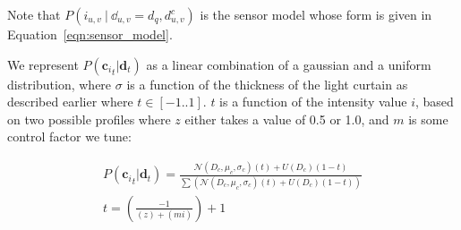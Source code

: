 Note that $P(i_{u, v}\ |\ \dd_{u, v} = d_q, d^c_{u, v})$ is the sensor model whose form is given in Equation~\ref{eqn:sensor_model}.



We represent $P\left(\mathbf{c_{\mathit{i}}}_{t}|\mathbf{d}_{t}\right)$ as a linear combination of a gaussian and a uniform distribution, where $\sigma$ is a function of the thickness of the light curtain as described earlier where $t\in[-1..1]$. $t$ is a function of the intensity value $i$, based on two possible profiles where $z$ either takes a value of 0.5 or 1.0, and $m$ is some control factor we tune:

\small
\begin{align}
   P\left(\mathbf{c_{\mathit{i}}}_{t}|\mathbf{d}_{t}\right)=\frac{\mathcal{N}\left(D_{c},\mu_{c},\sigma_{c}\right)\left(t\right)+U\left(D_{c}\right)(1-t)}{\sum\left(\mathcal{N}\left(D_{c},\mu_{c},\sigma_{c}\right)\left(t\right)+U\left(D_{c}\right)(1-t)\right)} \\
   t=\left(\frac{-1}{\left(z\right)+\left(mi\right)}\right)+1
   \label{eq:dist}
\end{align}
\normalsize

